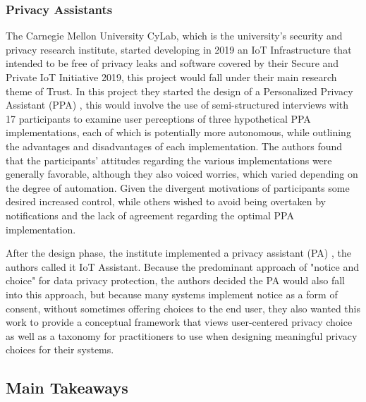 \documentclass[manuscript,screen,review,natbib=false]{acmart}
\begin{document}
\subsubsection{Privacy Assistants}

The Carnegie Mellon University CyLab, which is the university's security
and privacy research institute, started developing in 2019 an IoT Infrastructure
that intended to be free of privacy leaks and software covered by their
Secure and Private IoT Initiative 2019, this project would fall under
their main research theme of Trust. In this project they started the design
of a Personalized Privacy Assistant (PPA) \cite{ColnagoInforming}, this
would involve the use of semi-structured interviews with 17 participants
to examine user perceptions of three hypothetical PPA implementations,
each of which is potentially more autonomous, while outlining the advantages
and disadvantages of each implementation.
The authors found that the participants'
attitudes regarding the various implementations were generally favorable,
although they also voiced worries, which varied depending on the degree
of automation. Given the divergent motivations of participants some desired
increased control, while others wished to avoid being overtaken by notifications
and the lack of agreement regarding the optimal PPA implementation.

After the design phase, the institute implemented a privacy assistant (PA) \cite{FengDesign},
the authors called it IoT Assistant. Because the predominant approach of
"notice and choice" for data privacy protection, the authors decided the PA would
also fall into this approach, but because many systems implement notice
as a form of consent, without sometimes offering choices to the end user,
they also wanted this work to provide a conceptual framework that views
user-centered privacy choice as well as a taxonomy for practitioners to
use when designing meaningful privacy choices for their systems.

\subsection{Main Takeaways}
\end{document}
